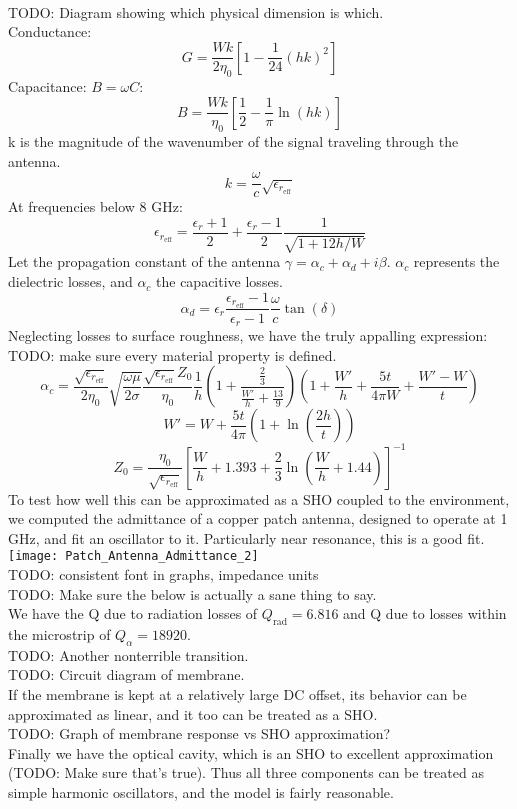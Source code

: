 \documentclass[final]{article}
\begin{document}
\\
TODO: Diagram showing which physical dimension is which.\\
Conductance:
\[G=\frac{Wk}{2\eta_0} \left[1-\frac{1}{24}\left(hk\right)^2\right]\]
Capacitance: \(B=\omega C\):
\[B=\frac{Wk}{\eta_0} \left[\frac{1}{2}-\frac{1}{\pi} \ln\left(hk\right)\right]\]
k is the magnitude of the wavenumber of the signal traveling through the antenna.
\[k=\frac{\omega}{c}\sqrt{\epsilon_{r_\text{eff}}}\]
At frequencies below 8 GHz:
\[\epsilon_{r_{\text{eff}}}=\frac{\epsilon_r+1}{2}+\frac{\epsilon_r-1}{2}\frac{1}{\sqrt{1+12h/W}}\]
Let the propagation constant of the antenna \(\gamma=\alpha_c+\alpha_d+i\beta\). \(\alpha_c\) represents the dielectric losses, and \(\alpha_c\) the capacitive losses.
\[\alpha_d= \epsilon_r \frac{\epsilon_{r_{\text{eff}}}-1}{\epsilon_r-1} \frac{\omega}{c} \tan(\delta)\]
Neglecting losses to surface roughness, we have the truly appalling expression:\\
TODO: make sure every material property is defined.
\[\alpha_c=\frac{\sqrt{\epsilon_{r_{\text{eff}}}}}{2\eta_0} \sqrt{\frac{\omega \mu}{2\sigma}} \frac{\sqrt{\epsilon_{r_{\text{eff}}}} Z_0}{\eta_0} \frac{1}{h}\left(1+\frac{\frac{2}{3}}{\frac{W'}{h}+\frac{13}{9}}\right)
\left(1+\frac{W'}{h}+\frac{5t}{4\pi W}+\frac{W'-W}{t}\right)\]
\[W'=W+\frac{5t}{4\pi}\left(1+\ln\left(\frac{2h}{t}\right)\right)\]
\[Z_0=\frac{\eta_0}{\sqrt{\epsilon_{r_{\text{eff}}}}}\left[\frac{W}{h}+1.393+\frac{2}{3}\ln\left(\frac{W}{h}+1.44\right)\right]^{-1}\]
To test how well this can be approximated as a SHO coupled to the environment, we computed the admittance of a copper patch antenna, designed to operate at 1 GHz, and fit an oscillator to it.
Particularly near resonance, this is a good fit.\\
\texttt{[image: Patch\_Antenna\_Admittance\_2]}\\
TODO: consistent font in graphs, impedance units\\
TODO: Make sure the below is actually a sane thing to say.\\
We have the Q due to radiation losses of \(Q_{\text{rad}}=6.816\) and Q due to losses within the microstrip of \(Q_{\alpha}=18920\).\\
TODO: Another nonterrible transition.\\
TODO: Circuit diagram of membrane.\\
If the membrane is kept at a relatively large DC offset, its behavior can be approximated as linear, and it too can be treated as a SHO.\\
TODO: Graph of membrane response vs SHO approximation?\\
Finally we have the optical cavity, which is an SHO to excellent approximation (TODO: Make sure that's true).
Thus all three components can be treated as simple harmonic oscillators, and the model is fairly reasonable.
\end{document}
